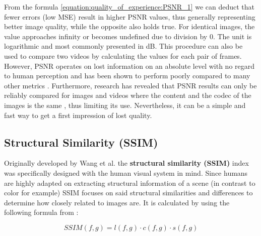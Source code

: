 From the formula \ref{equation:quality_of_experience:PSNR_1} we can deduct that fewer errors (low MSE) result in higher PSNR values, thus generally representing better image quality, while the opposite also holds true. For identical images, the value approaches infinity or becomes undefined due to division by 0. The unit is logarithmic and most commonly presented in dB. This procedure can also be used to compare two videos by calculating the values for each pair of frames. However, PSNR operates on lost information on an absolute level with no regard to human perception and has been shown to perform poorly compared to many other metrics \cite{HuGh08} \cite{HuGh12}. Furthermore, research has revealed that PSNR results can only be reliably compared for images and videos where the content and the codec of the images is the same \cite{HuGh08}, thus limiting its use. Nevertheless, it can be a simple and fast way to get a first impression of lost quality.




\subsection{Structural Similarity (SSIM)}
Originally developed by Wang et al.\cite{WBSS04} the \textbf{structural similarity (SSIM)} index was specifically designed with the human visual system in mind. Since humans are highly adapted on extracting structural information of a scene (in contrast to color for example) SSIM focuses on said structural similarities and differences to determine how closely related to images are. It is calculated by using the following formula from \cite{HoZi10}:

\begin{equation}
SSIM(f,g) = l(f,g) \cdot c(f,g) \cdot s(f,g)
\label{equation:quality_of_experience:SSIM_1}
\end{equation}

